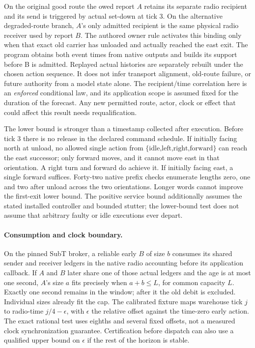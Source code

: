 \documentclass{article}
\begin{document}
On the original good route the owed report \(A\) retains its
separate radio recipient and its send is triggered by actual
set-down at tick 3. On the alternative degraded-route branch,
\(A\)'s only admitted recipient is the same physical radio
receiver used by report \(B\). The authored owner rule activates
this binding only when that exact old carrier has unloaded and
actually reached the east exit. The program obtains both event
times from native outputs and builds its support before B is
admitted. Replayed actual histories are separately rebuilt under
the chosen action sequence. It does not infer transport alignment,
old-route failure, or future authority from a model state alone.
The recipient/time correlation here is an \emph{enforced}
conditional law, and its application scope is assumed fixed for
the duration of the forecast. Any new permitted route, actor,
clock or effect that could affect this result needs requalification.

The lower bound is stronger than a timestamp collected after
execution. Before tick 3 there is no release in the declared
command schedule. If initially facing north at unload, no allowed
single action from \(\{\text{idle,left,right,forward}\}\) can
reach the east successor; only forward moves, and it cannot move
east in that orientation. A right turn and forward do achieve it.
If initially facing east, a single forward suffices.
Forty-two native prefix checks enumerate lengths zero, one and two
after unload across the two orientations. Longer words cannot
improve the first-exit lower bound. The positive service bound
additionally assumes the stated installed controller and bounded
stutter; the lower-bound test does not assume that arbitrary
faulty or idle executions ever depart.

\paragraph{Consumption and clock boundary.}
On the pinned SubT broker, a reliable early \(B\) of size \(b\)
consumes its shared sender and receiver ledgers in the native
radio accounting before its application callback. If \(A\) and \(B\) later share one of those
actual ledgers and the age is at most one second, \(A\)'s
size \(a\) fits precisely when \(a+b\le L\), for common
capacity \(L\). Exactly one second remains in the window;
after it the old debit is excluded. Individual sizes already
fit the cap. The calibrated fixture maps warehouse tick \(j\)
to radio-time \(j/4-\epsilon\), with \(\epsilon\) the relative
offset against the time-zero early action. The exact rational
test uses eighths and several fixed offsets, not a measured
clock synchronization guarantee. Certification before dispatch
can also use a qualified upper bound on \(\epsilon\) if the
rest of the horizon is stable.
\end{document}
